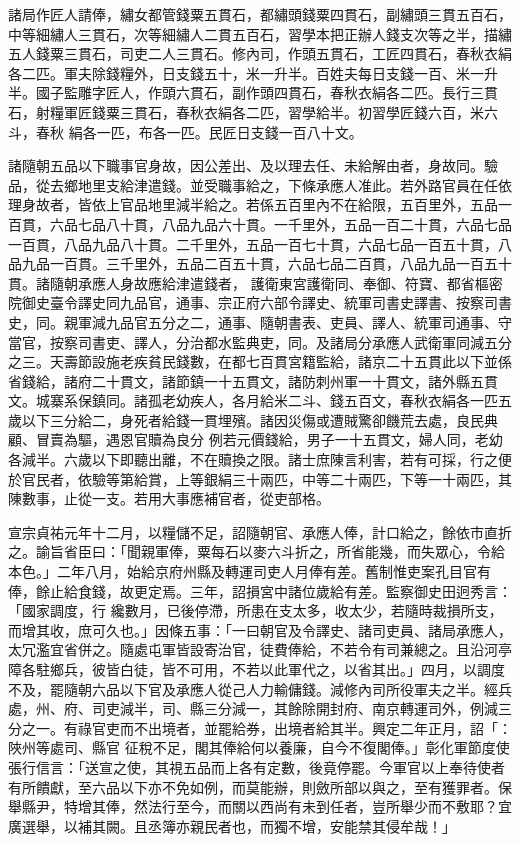 \begin{pinyinscope}
 諸局作匠人請俸，繡女都管錢粟五貫石，都繡頭錢粟四貫石，副繡頭三貫五百石，中等細繡人三貫石，次等細繡人二貫五百石，習學本把正辦人錢支次等之半，描繡五人錢粟三貫石，司吏二人三貫石。修內司，作頭五貫石，工匠四貫石，春秋衣絹各二匹。軍夫除錢糧外，日支錢五十，米一升半。百姓夫每日支錢一百、米一升半。國子監雕字匠人，作頭六貫石，副作頭四貫石，春秋衣絹各二匹。長行三貫石，射糧軍匠錢粟三貫石，春秋衣絹各二匹，習學給半。初習學匠錢六百，米六斗，春秋
 絹各一匹，布各一匹。民匠日支錢一百八十文。



 諸隨朝五品以下職事官身故，因公差出、及以理去任、未給解由者，身故同。驗品，從去鄉地里支給津遣錢。並受職事給之，下條承應人准此。若外路官員在任依理身故者，皆依上官品地里減半給之。若係五百里內不在給限，五百里外，五品一百貫，六品七品八十貫，八品九品六十貫。一千里外，五品一百二十貫，六品七品一百貫，八品九品八十貫。二千里外，五品一百七十貫，六品七品一百五十貫，八品九品一百貫。三千里外，五品二百五十貫，六品七品二百貫，八品九品一百五十貫。諸隨朝承應人身故應給津遣錢者，
 護衛東宮護衛同、奉御、符寶、都省樞密院御史臺令譯史同九品官，通事、宗正府六部令譯史、統軍司書史譯書、按察司書史，同。親軍減九品官五分之二，通事、隨朝書表、吏員、譯人、統軍司通事、守當官，按察司書吏、譯人，分治都水監典吏，同。及諸局分承應人武衛軍同減五分之三。天壽節設施老疾貧民錢數，在都七百貫宮籍監給，諸京二十五貫此以下並係省錢給，諸府二十貫文，諸節鎮一十五貫文，諸防刺州軍一十貫文，諸外縣五貫文。城寨系保鎮同。諸孤老幼疾人，各月給米二斗、錢五百文，春秋衣絹各一匹五歲以下三分給二，身死者給錢一貫埋殯。諸因災傷或遭賊驚卻饑荒去處，良民典顧、冒賣為驅，遇恩官贖為良分
 例若元價錢給，男子一十五貫文，婦人同，老幼各減半。六歲以下即聽出離，不在贖換之限。諸士庶陳言利害，若有可採，行之便於官民者，依驗等第給賞，上等銀絹三十兩匹，中等二十兩匹，下等一十兩匹，其陳數事，止從一支。若用大事應補官者，從吏部格。



 宣宗貞祐元年十二月，以糧儲不足，詔隨朝官、承應人俸，計口給之，餘依市直折之。諭旨省臣曰：「聞親軍俸，粟每石以麥六斗折之，所省能幾，而失眾心，令給本色。」二年八月，始給京府州縣及轉運司吏人月俸有差。舊制惟吏案孔目官有俸，餘止給食錢，故更定焉。三年，詔損宮中諸位歲給有差。監察御史田迥秀言：「國家調度，行
 纔數月，已後停滯，所患在支太多，收太少，若隨時裁損所支，而增其收，庶可久也。」因條五事：「一曰朝官及令譯史、諸司吏員、諸局承應人，太冗濫宜省併之。隨處屯軍皆設寄治官，徒費俸給，不若令有司兼總之。且沿河亭障各駐鄉兵，彼皆白徒，皆不可用，不若以此軍代之，以省其出。」四月，以調度不及，罷隨朝六品以下官及承應人從己人力輸傭錢。減修內司所役軍夫之半。經兵處，州、府、司吏減半，司、縣三分減一，其餘除開封府、南京轉運司外，例減三分之一。有祿官吏而不出境者，並罷給券，出境者給其半。興定二年正月，詔「：陜州等處司、縣官
 征稅不足，閣其俸給何以養廉，自今不復閣俸。」彰化軍節度使張行信言：「送宣之使，其視五品而上各有定數，後竟停罷。今軍官以上奉待使者有所饋獻，至六品以下亦不免如例，而莫能辦，則斂所部以與之，至有獲罪者。保舉縣尹，特增其俸，然法行至今，而關以西尚有未到任者，豈所舉少而不敷耶？宜廣選舉，以補其闕。且丞簿亦親民者也，而獨不增，安能禁其侵牟哉！」



\end{pinyinscope}